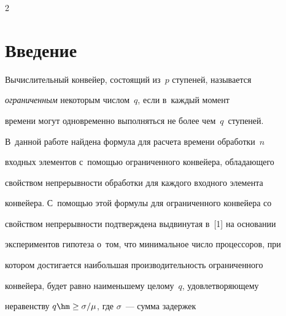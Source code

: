 

  


\vspace*{-3pt}













\thispagestyle{headings}





\begin{multicols}{2}





\label{st\stat}





\section{Введение}





  Вычислительный конвейер, состоящий из~$p$ ступеней, называется 


\textit{ограниченным} некоторым чис\-лом~$q$, если в~каждый момент 


времени могут одновременно выполняться не более чем~$q$~ступеней. 


В~данной работе найдена формула для расчета времени обработки~$n$ 


входных элементов с~помощью ограниченного конвейера, обладающего 


свойством непрерывности обработки для каждого входного элемента 


конвейера. С~по\-мощью этой формулы для ограниченного конвейера со 


свойством непрерывности подтверждена выдвинутая в~[1] на основании 


экспериментов гипотеза о~том, что минимальное число процессоров, при 


котором достигается наибольшая производительность ограниченного 


конвейера, будет равно наименьшему целому~$q$, удовлетворяющему 


неравенству $q\hm\geq \sigma/\mu$, где $\sigma$~--- сумма задержек 



\end{multicols}

